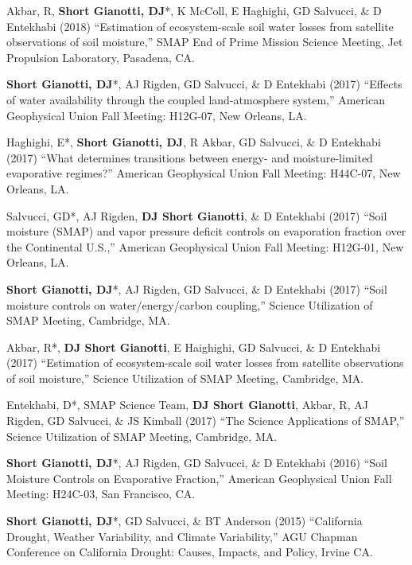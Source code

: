 \documentclass[10pt, a4paper]{article}
\newcommand{\lbr}{\vspace*{12pt}}
\newcommand{\years}[1]{\mbox{}\marginnote{\scriptsize #1}} %
\begin{document}
\years{2018}Akbar, R, \textbf{Short Gianotti, DJ}*, K McColl, E Haghighi, GD Salvucci, \& D Entekhabi (2018) ``Estimation of ecosystem-scale soil water losses from satellite observations of soil moisture,'' SMAP End of Prime Mission Science Meeting, Jet Propulsion Laboratory, Pasadena, CA. \lbr %

\years{2017}\textbf{Short Gianotti, DJ}*, AJ Rigden, GD Salvucci, \& D Entekhabi (2017) ``Effects of water availability through the coupled land-atmosphere system,'' American Geophysical Union Fall Meeting: H12G-07, New Orleans, LA.\lbr

\years{2017}Haghighi, E*, \textbf{Short Gianotti, DJ}, R Akbar, GD Salvucci, \& D Entekhabi (2017) ``What determines transitions between energy- and moisture-limited evaporative regimes?'' American Geophysical Union Fall Meeting: H44C-07, New Orleans, LA.\lbr

\years{2017}Salvucci, GD*, AJ Rigden, \textbf{DJ Short Gianotti}, \& D Entekhabi (2017) ``Soil moisture (SMAP) and vapor pressure deficit controls on evaporation fraction over the Continental U.S.,'' American Geophysical Union Fall Meeting: H12G-01, New Orleans, LA.\lbr

\years{2017}\textbf{Short Gianotti, DJ}*, AJ Rigden, GD Salvucci, \& D Entekhabi (2017) ``Soil moisture controls on water/energy/carbon coupling,'' Science Utilization of SMAP Meeting, Cambridge, MA.\lbr

\years{2017}Akbar, R*, \textbf{DJ Short Gianotti}, E Haighighi, GD Salvucci, \& D Entekhabi (2017) ``Estimation of ecosystem-scale soil water losses from satellite observations of soil moisture,'' Science Utilization of SMAP Meeting, Cambridge, MA.\lbr %

\years{2017}Entekhabi, D*, SMAP Science Team, \textbf{DJ Short Gianotti}, Akbar, R, AJ Rigden, GD Salvucci, \& JS Kimball (2017) ``The Science Applications of SMAP,'' Science Utilization of SMAP Meeting, Cambridge, MA.\lbr %

\years{2016}\textbf{Short Gianotti, DJ}*, AJ Rigden, GD Salvucci, \& D Entekhabi (2016) ``Soil Moisture Controls on Evaporative Fraction,'' American Geophysical Union Fall Meeting: H24C-03, San Francisco, CA.\lbr

\years{2015}\textbf{Short Gianotti, DJ}*, GD Salvucci, \& BT Anderson (2015) ``California Drought, Weather Variability, and Climate Variability,'' AGU Chapman Conference on California Drought: Causes, Impacts, and Policy, Irvine CA.\lbr
\end{document}
